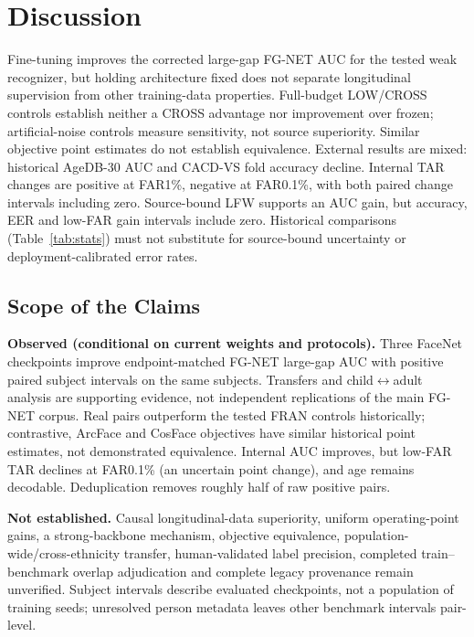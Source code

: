 \documentclass[journal]{IEEEtran}
\begin{document}
\section{Discussion}\label{sec:discussion}
Fine-tuning improves the corrected large-gap FG-NET AUC for the tested weak recognizer, but holding architecture fixed does not separate longitudinal supervision from other training-data properties. Full-budget LOW/CROSS controls establish neither a CROSS advantage nor improvement over frozen; artificial-noise controls measure sensitivity, not source superiority. Similar objective point estimates do not establish equivalence. External results are mixed: historical AgeDB-30 AUC and CACD-VS fold accuracy decline. Internal TAR changes are positive at FAR1\%, negative at FAR0.1\%, with both paired change intervals including zero. Source-bound LFW supports an AUC gain, but accuracy, EER and low-FAR gain intervals include zero. Historical comparisons (Table~\ref{tab:stats}) must not substitute for source-bound uncertainty or deployment-calibrated error rates.

\subsection{Scope of the Claims}\label{sec:scope}
\noindent\textbf{Observed (conditional on current weights and protocols).} Three FaceNet checkpoints improve endpoint-matched FG-NET large-gap AUC with positive paired subject intervals on the same subjects. Transfers and child$\leftrightarrow$adult analysis are supporting evidence, not independent replications of the main FG-NET corpus. Real pairs outperform the tested FRAN controls historically; contrastive, ArcFace and CosFace objectives have similar historical point estimates, not demonstrated equivalence. Internal AUC improves, but low-FAR TAR declines at FAR0.1\% (an uncertain point change), and age remains decodable. Deduplication removes roughly half of raw positive pairs.

\noindent\textbf{Not established.} Causal longitudinal-data superiority, uniform operating-point gains, a strong-backbone mechanism, objective equivalence, population-wide/cross-ethnicity transfer, human-validated label precision, completed train--benchmark overlap adjudication and complete legacy provenance remain unverified. Subject intervals describe evaluated checkpoints, not a population of training seeds; unresolved person metadata leaves other benchmark intervals pair-level.
\end{document}
